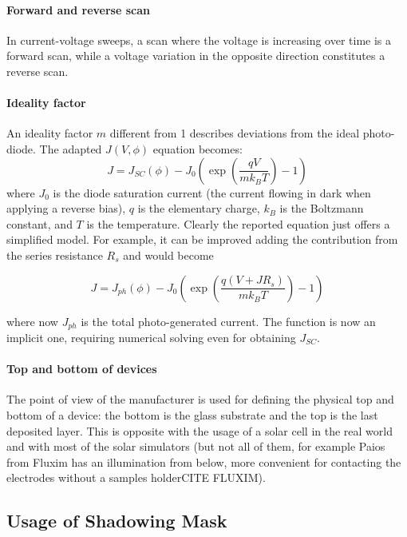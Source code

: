 \paragraph{Forward and reverse scan} In current-voltage sweeps, a scan where the voltage is increasing over time is a forward scan, while a voltage variation in the opposite direction constitutes a reverse scan.

\paragraph{Ideality factor} An ideality factor $m$ different from 1 describes deviations from the ideal photo-diode. The adapted $J(V,\phi)$ equation becomes\cite{Calado2018b}:
\begin{equation} \label{eq:photodiode}
J = J_{SC}(\phi) - J_0\left(\exp\left(\frac{qV}{mk_BT}\right)-1\right)
\end{equation}
where $J_0$ is the diode saturation current (the current flowing in dark when applying a reverse bias), $q$ is the elementary charge, $k_B$ is the Boltzmann constant, and $T$ is the temperature.  Clearly the reported equation just offers a simplified model. For example, it can be improved adding the contribution from the series resistance $R_s$ and would become 

$$J = J_{ph}(\phi) - J_0\left(\exp\left(\frac{q(V+JR_s)}{mk_BT}\right)-1\right)$$

where now $J_{ph}$ is the total photo-generated current. The function is now an implicit one, requiring numerical solving even for obtaining $J_{SC}$.

\paragraph{Top and bottom of devices} The point of view of the manufacturer is used for defining the physical top and bottom of a device: the bottom is the glass substrate and the top is the last deposited layer. This is opposite with the usage of a solar cell in the real world and with most of the solar simulators (but not all of them, for example Paios from Fluxim has an illumination from below, more convenient for contacting the electrodes without a samples holderCITE FLUXIM).

\subsection{Usage of Shadowing Mask}

